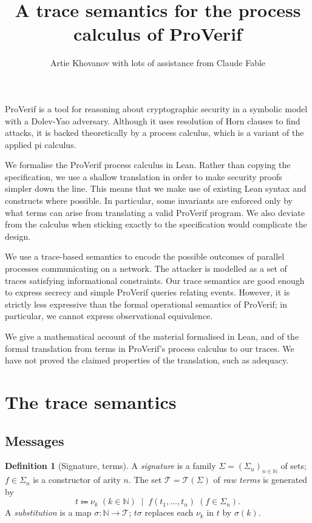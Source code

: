 \documentclass[11pt]{article}
\title{A trace semantics for the process calculus of ProVerif}
\author{Artie Khovanov with lots of assistance from Claude Fable}
\date{}
\theoremstyle{definition}
\newtheorem{definition}{Definition}[section]
\theoremstyle{plain}
\theoremstyle{remark}
\newcommand{\N}{\mathbb{N}}
\newcommand{\Terms}{\mathcal{T}}
\begin{document}
\maketitle

ProVerif is a tool for reasoning about cryptographic security in a symbolic model with a Dolev-Yao adversary. Although it uses resolution of Horn clauses to find attacks, it is backed theoretically by a process calculus, which is a variant of the applied pi calculus.

We formalise the ProVerif process calculus in Lean. Rather than copying the specification, we use a shallow translation in order to make security proofs simpler down the line. This means that we make use of existing Lean syntax and constructs where possible. In particular, some invariants are enforced only by what terms can arise from translating a valid ProVerif program. We also deviate from the calculus when sticking exactly to the specification would complicate the design.

We use a trace-based semantics to encode the possible outcomes of parallel processes communicating on a network. The attacker is modelled as a set of traces satisfying informational constraints. Our trace semantics are good enough to express secrecy and simple ProVerif queries relating events. However, it is strictly less expressive than the formal operational semantics of ProVerif; in particular, we cannot express observational equivalence. 

We give a mathematical account of the material formalised in Lean, and of the formal translation from terms in ProVerif's process calculus to our traces. We have not proved the claimed properties of the translation, such as adequacy.

\section{The trace semantics}

\subsection{Messages}

\begin{definition}[Signature, terms]
A \emph{signature} is a family $\Sigma=(\Sigma_n)_{n\in\N}$ of sets; $f\in\Sigma_n$ is a constructor of arity $n$. The set $\Terms=\Terms(\Sigma)$ of \emph{raw terms} is generated by
\[
t \Coloneqq \nu_k \;(k\in\N) \;\mid\; f(t_1,\dots,t_n)\;(f\in\Sigma_n).
\]
A \emph{substitution} is a map $\sigma:\N\to\Terms$; $t\sigma$ replaces each $\nu_k$ in $t$ by $\sigma(k)$.
\end{definition}
\end{document}
